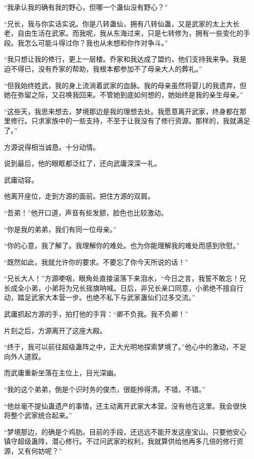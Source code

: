 \begin{this_body}
“我承认我的确有我的野心，但哪一个蛊仙没有野心？”

“兄长，我与你实话实说。你是八转蛊仙，拥有八转仙蛊，又是武家的太上大长老，自由生活在武家。而我呢，我从东海过来，只是七转修为，拥有一些变化的手段。我怎么可能斗得过你？我也从未想和你作对争斗。”

“我只想让我的修行，更上一层楼。乔家和我达成了盟约，他们支持我来争。我是迫不得已，没有乔家的帮助，我根本都参加不了母亲大人的葬礼。”

“但我始终姓武，我的身上流淌着武家的血脉。我的母亲虽然将婴儿的我遗弃，但她在弥留之际，又召唤我回来。不管她到底如何想的，她始终是我的亲生母亲。”

“这些天，我思来想去，梦境那边是我的理想去处。我愿意离开武家，终身都在那里修行。只求家族中的一些支持，不至于让我没有了修行资源。那样的，我就满足了。”

方源说得相当诚恳。十分动情。

说到最后，他的眼眶都泛红了，还向武庸深深一礼。

武庸动容。

他离开座位，走到方源的面前。把住方源的双肩。

“吾弟！”他开口道，声音有些发颤，脸色也比较激动。

“你是我的弟弟，我们有同一位母亲。”

“你的心意，我了解了。我理解你的难处。也为你能理解我的难处而感到欣慰。”

“既然如此，我就允许你的要求。不要忘了你今天所说的话！”

“兄长大人！”方源哽咽，眼角处直接滚落下来泪水，“今日之言，我誓不敢忘！兄长成全小弟，小弟将为兄长摇旗呐喊。日后，非兄长亲口同意，小弟绝不擅自行动，踏足武家大本营一步。也绝不私下与武家蛊仙们过多交流。”

武庸抓起方源的手，拍打他的手背：“卿不负我。我不负卿！”

片刻之后，方源离开了这座大殿。

“终于，我可以前往超级蛊阵之中，正大光明地探索梦境了。”他心中的激动，不足向外人道叙。

而武庸重新坐落在主位上，目光深幽。

“我的这个弟弟，倒是个识时务的俊杰，很能拎得清。不错，不错。”

“他丝毫不提仙蛊遗产的事情，还主动离开武家大本营。没有他在这里。我会很快将整个武家统合起来。”

“梦境那边，的确是个鸡肋。目前的手段，还远远不能开发这座宝山。只要他安心镇守超级蛊阵，潜心修行。不过问武家的权利，我就算供给他再多几倍的修行资源，又有何妨呢？”


\end{this_body}
